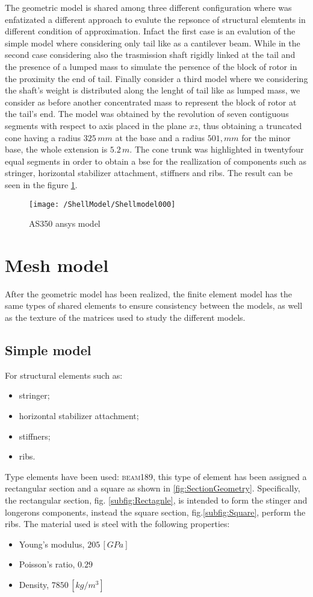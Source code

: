 The geometric model is shared among three different configuration where was enfatizated a different approach to evalute the repsonce of structural elemtents in different condition of approximation. Infact the first case is an evalution of the simple model where considering only tail like as a cantilever beam. 
While in the second case considering also the trasmission shaft rigidly linked at the tail and the presence of a lumped mass to simulate the persence of the block of rotor in the proximity the end of tail. 
Finally consider a third model where we considering the shaft's weight is distributed along the lenght of tail like as lumped mass, we consider as before another concentrated mass to represent the block of rotor at the tail's end.
The model was obtained by the revolution of seven contiguous segments with respect to axis placed in the plane $xz$, thus obtaining a truncated cone having a radius $325\,mm$ at the base and a radius $501,mm$ for the minor base, the whole extension is $5.2\,m$.
The cone trunk was highlighted in twentyfour equal segments in order to obtain a bse for the reallization of components such as stringer, horizontal stabilizer attachment, stiffners and ribs.
The result can be seen in the figure \ref{fig:Ansys1}.

\begin{figure}[htb]
\centering
\texttt{[image: /ShellModel/Shellmodel000]}
\caption{AS350 ansys model}
\label{fig:Ansys1}
\end{figure}

\section{Mesh model}
After the geometric model has been realized, the finite element model has the same types of shared elements to ensure consistency between the models, as well as the texture of the matrices used to study the different models.
\subsection{Simple model}
For structural elements such as:
\begin{itemize}
\item stringer;
\item horizontal stabilizer attachment;
\item stiffners;
\item ribs.
\end{itemize}
Type elements have been used: \textsc{beam189}, this type of element has been assigned a rectangular section and a square as shown in \ref{fig:SectionGeometry}. Specifically, the rectangular section, fig. \ref{subfig:Rectagnle}, is intended to form the stinger and longerons components, instead the square section, fig.\ref{subfig:Square}, perform the ribs.
The material used is steel with the following properties:
\begin{itemize}
\item Young's modulus, $205\,[GPa]$ 
\item Poisson's ratio, $0.29$
\item Density, $7850	\,[kg/m^3]$
\end{itemize}

